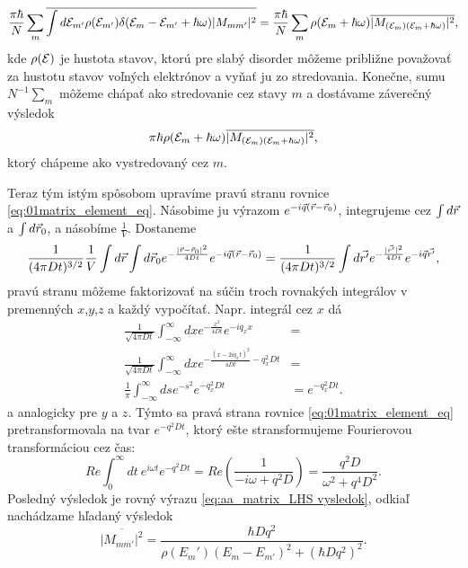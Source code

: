 \begin{equation}
 \frac{\pi \hbar}{N}\sum_m  \overline{\int d\mathcal{E}_{m'} \rho(\mathcal{E}_{m'}) \delta(\mathcal{E}_m-\mathcal{E}_{m'}+\hbar \omega) |M_{mm'}|^2} =\frac{\pi \hbar}{N}\sum_m \rho(\mathcal{E}_{m}+\hbar\omega)\overline{|M_{(\mathcal{E}_m)(\mathcal{E}_m+\hbar\omega)}|^2} \text{,}
\end{equation}
kde $\rho(\mathcal{E})$ je hustota stavov, ktorú pre slabý disorder môžeme približne považovať za hustotu stavov voľných elektrónov a vyňať ju zo stredovania. Konečne, sumu $N^{-1}\sum_m$ môžeme chápať ako stredovanie cez stavy $m$ a 
dostávame záverečný výsledok
\begin{equation}
 \label{eq:aa_matrix_LHS vysledok}
\pi \hbar \rho(\mathcal{E}_{m}+\hbar\omega)  \overline{|M_{(\mathcal{E}_m)(\mathcal{E}_m+\hbar\omega)}|^2} \text{,}
\end{equation}
ktorý chápeme ako vystredovaný cez $m$.


Teraz tým istým spôsobom upravíme pravú stranu rovnice \eqref{eq:01matrix_element_eq}. Násobime ju výrazom $e^{-i\vec{q}(\vec{r}-\vec{r}_0)}$, integrujeme cez $\int d\vec{r}$ a $\int d\vec{r}_0$, a násobíme $\frac{1}{V}$. Dostaneme 
\begin{equation}
\label{eq:aa_matrix_RHS begin}
 \frac{1}{(4\pi Dt)^{3/2}}\frac{1}{V} \int d\vec{r} \int d\vec{r}_0 e^{-\frac{|\vec{r}-\vec{r}_0|^2}{4Dt}}e^{-i\vec{q}(\vec{r}-\vec{r}_0)} =
 \frac{1}{(4\pi Dt)^{3/2}}\int d\vec{r'} e^{-\frac{|\vec{r'}|^2}{4Dt}}e^{-i\vec{q} \vec{r'}} \text{,}
\end{equation}
pravú stranu môžeme faktorizovať na súčin troch rovnakých integrálov v premenných $x$,$y$,$z$ a každý vypočítať. Napr. integrál cez $x$ dá
\begin{align*}
  \frac{1}{\sqrt{4\pi Dt}}\int_{-\infty}^{\infty} dx e^{-\frac{x^2}{4Dt}}e^{-iq_x x} &=\\
  \frac{1}{\sqrt{4\pi Dt}}\int_{-\infty}^{\infty} dx e^{-\frac{(x-2iq_xt)^2}{4Dt}-q_x^2Dt}&=\\
  \frac{1}{\pi}\int_{-\infty}^{\infty} ds e^{-s^2} e^{-q_x^2Dt}&= e^{-q_x^2Dt}\text{.}
\end{align*}
a analogicky pre $y$ a $z$.  Týmto sa pravá strana rovnice \eqref{eq:01matrix_element_eq} pretransformovala na tvar $e^{-q^2Dt}$,
ktorý ešte stransformujeme Fourierovou transformáciou cez čas:
\begin{equation}
\label{eq:aa_matrix_RHS}
 Re{\int_0^{\infty}dt\ e^{i\omega t}e^{-q^2Dt}}=Re(\frac{1}{-i\omega+q^2D})=\frac{q^2D}{\omega^2+q^4D^2}\text{.}
\end{equation}
Posledný výsledok je rovný výrazu \eqref{eq:aa_matrix_LHS vysledok}, odkiaľ nachádzame hľadaný výsledok
\begin{equation}
 \label{eq:aa_matrix_element_final}
 \overline{|M_{mm'}|^2}=\frac{\hbar D q^2}{\rho(E_m')(E_m-E_{m'})^2+(\hbar Dq^2)^2}\text{.}
\end{equation}

